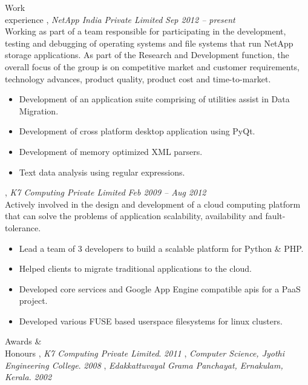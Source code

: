 \documentclass{resume}
\begin{document}
\begin{category}{Work \\experience}
  , {\em NetApp India Private Limited} \hfill {\em Sep 2012 -- present}\\
  Working as part of a team responsible for participating in the development, testing and 
  debugging of operating systems and file systems that run NetApp storage applications. 
  As part of the Research and Development function, the overall focus of the group is on 
  competitive market and customer requirements, technology advances, product quality, 
  product cost and time-to-market.
  \begin{itemize}
  \item Development of an application suite comprising of utilities assist in Data Migration.
  \item Development of cross platform desktop application using PyQt.
  \item Development of memory optimized XML parsers.
  \item Text data analysis using regular expressions.
  \end{itemize}
  , {\em K7 Computing Private Limited} \hfill {\em Feb 2009 -- Aug 2012}\\
  Actively involved in the design and development of a cloud computing platform that can solve 
  the problems of application scalability, availability and fault-tolerance.
  \begin{itemize} 
  \item Lead a team of 3 developers to build a scalable platform for Python \& PHP.
  \item Helped clients to migrate traditional applications to the cloud.
  \item Developed core services and Google App Engine compatible apis for a PaaS project.
  \item Developed various FUSE based userspace filesystems for linux clusters.
  \end{itemize}
\end{category}


\begin{category}{Awards \&\\ Honours}
  , {\em K7 Computing Private Limited}. \hfill {\em 2011}
  , {\em Computer Science, Jyothi Engineering College}. \hfill {\em 2008}
  , {\em Edakkattuvayal Grama Panchayat, Ernakulam, Kerala.} \hfill {\em 2002}
\end{category}
\end{document}
